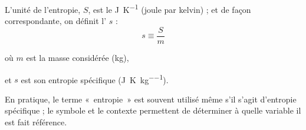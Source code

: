 		L’unité de l’entropie, $S$, est le \si{\joule\per\kelvin} (\si{joule} par \si{kelvin}) ; et de façon correspondante, on définit l’ $s$ :
		\begin{equation}
			s \equiv \frac{S}{m}
		\end{equation}
		\begin{equationterms}
			\item où \tab $m$ \tab est la masse considérée (\si{\kilogram}),
			\item et \tab $s$ \tab est son entropie spécifique (\si{\joule\per\kelvin\per\kilogram}).
		\end{equationterms}

		En pratique, le terme «~entropie~» est souvent utilisé même s’il s’agit d’entropie spécifique ; le symbole et le contexte permettent de déterminer à quelle variable il est fait référence.

